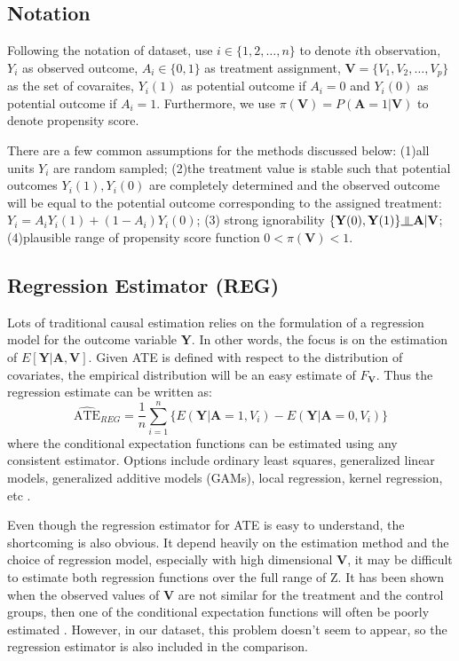 \documentclass[12pt, oneside]{article}
\newcommand{\bA}{\mathbf{A}}
\newcommand{\bY}{\mathbf{Y}}
\newcommand{\bV}{\mathbf{V}}
\newcommand{\indep}{\rotatebox[origin=c]{90}{$\models$}}
\begin{document}
\subsection{Notation}
Following the notation of dataset, use $i \in \{1,2,\ldots,n\}$ to denote $i$th observation, $Y_i$ as observed outcome, $A_i\in \{0,1\}$ as treatment assignment, $\bV=\{V_1,V_2,\ldots,V_p\}$ as the set of covaraites, $Y_i(1)$ as potential outcome if $A_i=0$ and $Y_i(0)$ as potential outcome if $A_i=1$. Furthermore, we use $\pi(\bV)=P(\bA=1|\bV)$ to denote propensity score.

There are a few common assumptions for the methods discussed below: (1)all units $Y_i$ are random sampled; (2)the treatment value is stable such that potential outcomes $Y_i(1), Y_i(0)$ are completely determined and the observed outcome will be equal to the potential outcome corresponding to the assigned treatment: $Y_i=A_iY_i(1)+(1-A_i)Y_i(0)$; (3) strong ignorability $\{\bY(0),\bY(1)\} \indep \bA|\bV$; (4)plausible range of propensity score function $0<\pi(\bV)<1$.

\subsection{Regression Estimator (REG)}
Lots of traditional causal estimation relies on the formulation of a regression model for the outcome variable $\bY$. In other words, the focus is on the estimation of $E[\bY|\bA,\bV]$. Given ATE is defined with respect to the distribution of covariates, the empirical distribution will be an easy estimate of $F_{\bV}$. Thus the regression estimate can be written as:
\begin{equation}
\widehat{\mbox{ATE}}_{REG}=\frac{1}{n}\sum_{i=1}^n \{E(\bY | \bA = 1, V_i) - E(\bY | \bA = 0, V_i)\}
\end{equation}
where the conditional expectation functions can be estimated using any consistent estimator. Options include ordinary least squares, generalized linear models, generalized additive models (GAMs), local regression, kernel regression, etc \cite{Pearl2002}. 

Even though the regression estimator for ATE is easy to understand, the shortcoming is also obvious. It depend heavily on the estimation method and the choice of regression model, especially with high dimensional $\bV$, it may be difficult to estimate both regression functions over the full range of Z. It has been shown when the observed values of $\bV$ are not similar for the treatment and the control groups, then one of the conditional expectation functions will often be poorly estimated \cite{King2006}. However, in our dataset, this problem doesn't seem to appear, so the regression estimator is also included in the comparison.
\end{document}
